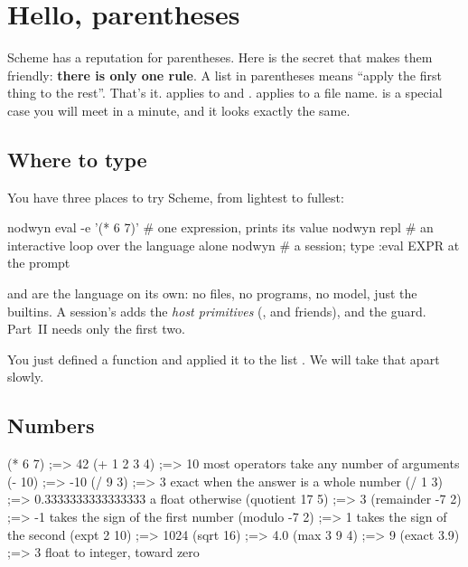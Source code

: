 \chapter{Hello, parentheses}
\label{ch:hello}

Scheme has a reputation for parentheses. Here is the secret that makes them
friendly: \textbf{there is only one rule}. A list in parentheses means
``apply the first thing to the rest''. That's it.  applies
\code{+} to  and .  applies
 to a file name.  is a special case you will
meet in a minute, and it looks exactly the same.

\section{Where to type}

You have three places to try Scheme, from lightest to fullest:

\begin{sh}
nodwyn eval -e '(* 6 7)'       # one expression, prints its value
nodwyn repl                    # an interactive loop over the language alone
nodwyn                         # a session; type :eval EXPR at the prompt
\end{sh}

 and  are the language on its own: no files, no
programs, no model, just the builtins. A session's  adds the
\emph{host primitives} (,  and friends), and
the guard. Part~II needs only the first two.

\begin{tryit}
You just defined a function and applied it to the list .
We will take that apart slowly.
\end{tryit}

\section{Numbers}

\begin{scm}
(* 6 7)            ;=> 42
(+ 1 2 3 4)        ;=> 10       most operators take any number of arguments
(- 10)             ;=> -10
(/ 9 3)            ;=> 3        exact when the answer is a whole number
(/ 1 3)            ;=> 0.3333333333333333   a float otherwise
(quotient 17 5)    ;=> 3
(remainder -7 2)   ;=> -1       takes the sign of the first number
(modulo -7 2)      ;=> 1        takes the sign of the second
(expt 2 10)        ;=> 1024
(sqrt 16)          ;=> 4.0
(max 3 9 4)        ;=> 9
(exact 3.9)        ;=> 3        float to integer, toward zero
\end{scm}

